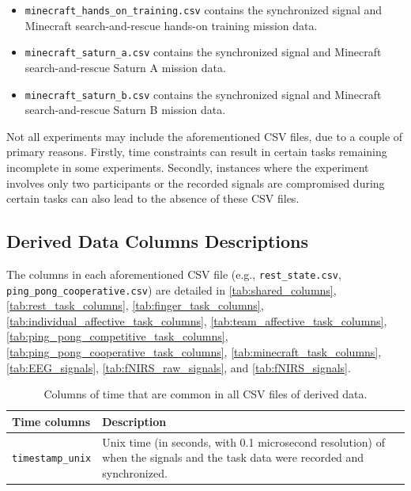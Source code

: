 \begin{itemize}
  \item \texttt{minecraft\_hands\_on\_training.csv} contains the synchronized signal and Minecraft search-and-rescue hands-on training mission data.
  \item \texttt{minecraft\_saturn\_a.csv} contains the synchronized signal and Minecraft search-and-rescue Saturn A mission data.
  \item \texttt{minecraft\_saturn\_b.csv} contains the synchronized signal and Minecraft search-and-rescue Saturn B mission data.
\end{itemize}

Not all experiments may include the aforementioned CSV files, due to a couple
of primary reasons. Firstly, time constraints can result in certain tasks
remaining incomplete in some experiments. Secondly, instances where the
experiment involves only two participants or the recorded signals are
compromised during certain tasks can also lead to the absence of these CSV
files.

\subsection{Derived Data Columns Descriptions}
\label{sec:derived_data_cols_desc}

The columns in each aforementioned CSV file (e.g., \texttt{rest\_state.csv},
\texttt{ping\_pong\_cooperative.csv}) are detailed in
\autoref{tab:shared_columns}, \autoref{tab:rest_task_columns},
\autoref{tab:finger_task_columns},
\autoref{tab:individual_affective_task_columns},
\autoref{tab:team_affective_task_columns},
\autoref{tab:ping_pong_competitive_task_columns},
\autoref{tab:ping_pong_cooperative_task_columns},
\autoref{tab:minecraft_task_columns}, \autoref{tab:EEG_signals},
\autoref{tab:fNIRS_raw_signals}, and \autoref{tab:fNIRS_signals}.


\begin{table}
    \footnotesize
    \centering
    \begin{tabularx}{\textwidth}{lX}
        \toprule
        Time columns & Description \\
        \midrule
        \texttt{timestamp\_unix} & Unix time (in seconds, with 0.1 microsecond resolution) of when the signals and the task data were recorded and synchronized.\\
        \bottomrule
    \end{tabularx}
    \caption{Columns of time that are common in all CSV files of derived data.}
    \label{tab:shared_columns}
\end{table}

